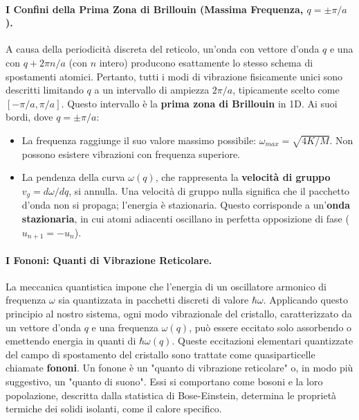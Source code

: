 \paragraph{I Confini della Prima Zona di Brillouin (Massima Frequenza, \(q = \pm \pi/a\)).}
A causa della periodicità discreta del reticolo, un'onda con vettore d'onda \(q\) e una con \(q + 2\pi n/a\) (con \(n\) intero) producono esattamente lo stesso schema di spostamenti atomici. Pertanto, tutti i modi di vibrazione fisicamente unici sono descritti limitando \(q\) a un intervallo di ampiezza \(2\pi/a\), tipicamente scelto come \([-\pi/a, \pi/a]\). Questo intervallo è la \textbf{prima zona di Brillouin} in 1D. Ai suoi bordi, dove \(q = \pm \pi/a\):
\begin{itemize}
    \item La frequenza raggiunge il suo valore massimo possibile: \(\omega_{max} = \sqrt{4K/M}\). Non possono esistere vibrazioni con frequenza superiore.
    \item La pendenza della curva \(\omega(q)\), che rappresenta la \textbf{velocità di gruppo} \(v_g = d\omega/dq\), si annulla. Una velocità di gruppo nulla significa che il pacchetto d'onda non si propaga; l'energia è stazionaria. Questo corrisponde a un'\textbf{onda stazionaria}, in cui atomi adiacenti oscillano in perfetta opposizione di fase (\(u_{n+1} = -u_n\)).
\end{itemize}

\paragraph{I Fononi: Quanti di Vibrazione Reticolare.}
La meccanica quantistica impone che l'energia di un oscillatore armonico di frequenza \(\omega\) sia quantizzata in pacchetti discreti di valore \(\hbar\omega\). Applicando questo principio al nostro sistema, ogni modo vibrazionale del cristallo, caratterizzato da un vettore d'onda \(q\) e una frequenza \(\omega(q)\), può essere eccitato solo assorbendo o emettendo energia in quanti di \(\hbar\omega(q)\). Queste eccitazioni elementari quantizzate del campo di spostamento del cristallo sono trattate come quasiparticelle chiamate \textbf{fononi}. Un fonone è un "quanto di vibrazione reticolare" o, in modo più suggestivo, un "quanto di suono". Essi si comportano come bosoni e la loro popolazione, descritta dalla statistica di Bose-Einstein, determina le proprietà termiche dei solidi isolanti, come il calore specifico.
